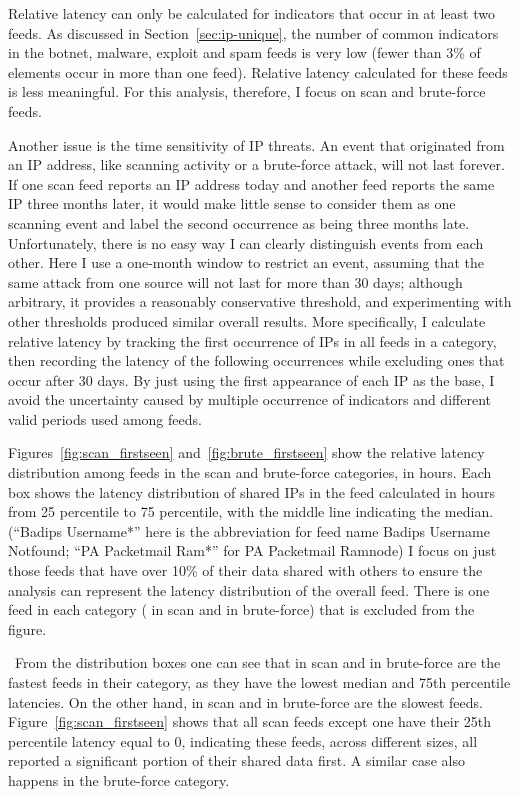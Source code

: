 Relative latency can only be calculated for
indicators that occur in at least two feeds. As discussed in
Section~\ref{sec:ip-unique}, the number of common indicators in the botnet, malware, exploit and spam feeds is very low (fewer than 3\% of elements occur in more than one feed). Relative latency calculated for these feeds is less meaningful. For this analysis, therefore, I focus on scan and brute-force feeds.

Another issue is the time sensitivity of IP threats. An event that originated from
an IP address, like scanning activity or a brute-force attack, will not last
forever. If one scan feed reports an IP address today and another feed reports
the same IP three months later, it would make little sense to consider them as one
scanning event and label the second occurrence as being three months late.
Unfortunately, there is no easy way I can clearly distinguish events from each
other. Here I use a one-month window to restrict an event, assuming that the same
attack from one source will not last for more than 30 days; although arbitrary, it provides a reasonably conservative threshold, and experimenting with other thresholds produced similar overall results. More specifically, I calculate relative latency by tracking the
first occurrence of IPs in all feeds in a category, then recording the latency of the
following occurrences while excluding ones that occur after 30 days. By just
using the first appearance of each IP as the base, I avoid the uncertainty caused by
multiple occurrence of indicators and different valid periods used among feeds.


Figures~\ref{fig:scan_firstseen} and~\ref{fig:brute_firstseen} show the relative
latency distribution among feeds in the scan and brute-force categories, in hours. Each box shows the latency distribution of shared IPs in the feed calculated in hours
from 25 percentile to 75 percentile, with the middle line indicating the median.
(``Badips Username*'' here is the abbreviation for feed name Badips
Username Notfound; ``PA Packetmail Ram*'' for PA Packetmail Ramnode)
I focus on just those feeds that have
over 10\% of their data shared with others to ensure the analysis can represent the latency
distribution of the overall feed. There is one feed in each category ({\feedTSSnort}
in scan and {\feedTSBrute} in brute-force) that is excluded from the figure.

\finding\
From the distribution boxes one can see that {\feedetiprep} in scan and {\feedbadipssh}
in brute-force are the fastest feeds in their category, as they have the lowest median
and 75th percentile latencies. On the other hand, {\feedTSAnalyst} in scan and
{\feedbadipbot} in brute-force are the slowest feeds. Figure~\ref{fig:scan_firstseen}
shows that all scan feeds except one have their 25th percentile latency equal to 0, indicating
these feeds, across different sizes, all reported a significant portion of their shared
data first. A similar case also happens in the brute-force category.

